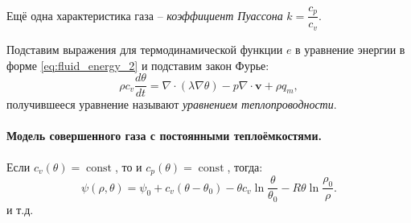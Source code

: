 Ещё одна характеристика газа -- \emph{коэффициент Пуассона} $k = \dfrac{c_p}{c_v}$.

Подставим выражения для термодинамической функции $e$ в уравнение энергии в форме \eqref{eq:fluid_energy_2} и подставим закон Фурье:
\[
  \rho c_v \dfrac{d\theta}{dt} = \nabla \cdot (\lambda \nabla \theta) - p  \nabla\cdot\mathbf{v} + \rho q_m,
\]
получившееся уравнение называют \emph{уравнением теплопроводности}.

\paragraph{Модель совершенного газа с постоянными теплоёмкостями.}

Если $c_v(\theta) = \operatorname{const}$, то и $c_p(\theta) = \operatorname{const}$, тогда:
\[
  \psi(\rho, \theta) = \psi_0 + c_v (\theta - \theta_0) - \theta c_v \ln \dfrac{\theta}{\theta_0} - R\theta \ln \dfrac{\rho_0}{\rho}.
\]
и т.д.
